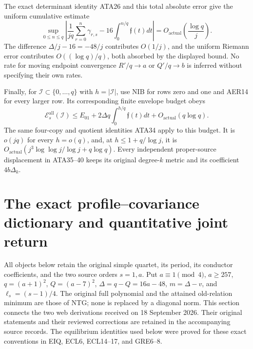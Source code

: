 The exact determinant identity ATA26 and this total absolute error
give the uniform cumulative estimate
\[
 \sup_{0\le n\le q}
 \left|\frac1{jq}\sum_{r=0}^n\gamma_{r,s}
               -16\int_0^{n/q}\mathfrak f(t)dt\right|
       =O_{\mathrm{actual}}\left(\frac{\log q}{j}\right).
                                                               \tag{AER21}
\]
The difference $\Delta/j-16=-48/j$ contributes $O(1/j)$,
and the uniform Riemann error contributes $O((\log q)/q)$,
both absorbed by the displayed bound.  No rate for moving
endpoint convergence $R'/q\to a$ or $Q'/q\to b$ is inferred
without specifying their own rates.

Finally, for $\mathscr I\subset\{0,\ldots,q\}$ with
$h=|\mathscr I|$, use NIB for rows zero and one and AER14 for
every larger row.  Its corresponding finite envelope budget obeys
\[
 \mathcal E_s^{\mathrm{all}}(\mathscr I)
 \le E_{01}+2\Delta q\int_0^{h/q}\mathfrak f(t)dt
                  +O_{\mathrm{actual}}(q\log q).        \tag{AER22}
\]
The same four-copy and quotient identities ATA34 apply to this
budget.  It is $o(jq)$ for every $h=o(q)$, and, at
$h\le1+q/\log j$, it is
$O_{\mathrm{actual}}(j^3\log\log j/\log j+q\log q)$.
Every independent proper-source displacement in ATA35--40 keeps
its original degree-$k$ metric and its coefficient $4b\Delta_k$.
\endgroup


\begingroup
\section{The exact profile--covariance dictionary and quantitative joint return}
\label{sec:PCB}

All objects below retain the original simple quartet, its period, its
conductor coefficients, and the two source orders $s=1,a$. Put
$a\equiv1\pmod4$, $a\ge257$, $q=(a+1)^2$, $Q=(a-7)^2$,
$\Delta=q-Q=16a-48$, $m=\Delta-v$, and $\ell_s=(s-1)/4$.
The original full polynomial and the attained old-relation minimum are
those of NTG; none is replaced by a diagonal norm. This section connects
the two web derivations received on 18 September 2026. Their original
statements and their reviewed corrections are retained in the accompanying
source records. The equilibrium identities used below were proved for
these exact conventions in EIQ, ECL6, ECL14--17, and GRE6--8.

